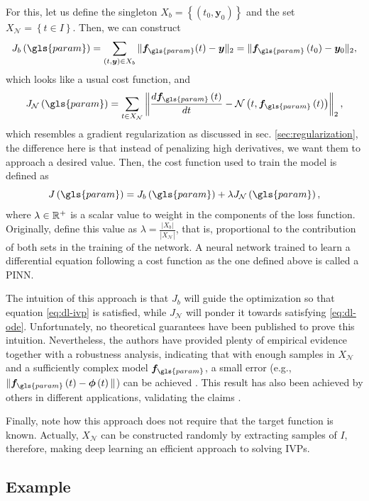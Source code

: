 For this, let us define the singleton $X_b=\left\{ \left( t_0,\bm{y}_0 \right)  \right\} $ and the set $X_{\mathcal{N}}=\left\{ t\in I \right\} $. Then, we can construct \[
    J_b\left( \gls{param} \right) = \sum_{\left( t,\bm{y} \right) \in X_b } \|\bm{f}_{\gls{param}}(t) - \bm{y}\|_2 = \|\bm{f}_{\gls{param}}\left( t_0 \right) -\bm{y}_0\|_2
,\] which looks like a usual cost function, and \[
J_{\mathcal{N}}\left( \gls{param} \right) = \sum_{t \in X_{\mathcal{N}}} \left\| \frac{d \bm{f}_{\gls{param}}\left( t \right) }{dt} - \mathcal{N}\left( t,\bm{f}_{\gls{param}}\left( t \right)  \right)  \right\|_2
,\] which resembles a gradient regularization as discussed in sec. \ref{sec:regularization}, the difference here is that instead of penalizing high derivatives, we want them to approach a desired value.
Then, the cost function used to train the model is defined as \[
J\left( \gls{param} \right) = J_b\left( \gls{param} \right) + \lambda J_{\mathcal{N}}\left( \gls{param} \right) 
,\] where $\lambda \in \mathbb{R}^+$ is a scalar value to weight in the components of the loss function.
Originally, \textcite{Raissi2019} define this value as $\lambda = \frac{|X_{b}|}{|X_{\mathcal{N}}|}$, that is, proportional to the contribution of both sets in the training of the network.
A neural network trained to learn a differential equation following a cost function as the one defined above is called a \gls{PINN}.

The intuition of this approach is that $J_b$ will guide the optimization so that equation \eqref{eq:dl-ivp} is satisfied, while  $J_{\mathcal{N}}$ will ponder it towards satisfying \eqref{eq:dl-ode}.
Unfortunately, no theoretical guarantees have been published to prove this intuition.
Nevertheless, the authors have provided plenty of empirical evidence together with a robustness analysis, indicating that with enough samples in $X_{\mathcal{N}}$ and a sufficiently complex model $\bm{f}_{\gls{param}}$, a small error (e.g., $\|\bm{f}_{\gls{param}}\left( t \right)-\bm{\phi}\left( t \right) \| $) can be achieved \cite{Raissi2019}.
This result has also been achieved by others in different applications, validating the claims \cite{noakoasteen_physics-informed_2020,zhang_physics-informed_2020,Arnold2021,Yucesan2022}.

Finally, note how this approach does not require that the target function is known.
Actually, $X_{\mathcal{N}}$ can be constructed randomly by extracting samples of $I$,
therefore, making deep learning an efficient approach to solving \gls{IVP}s.

\subsection*{Example}

